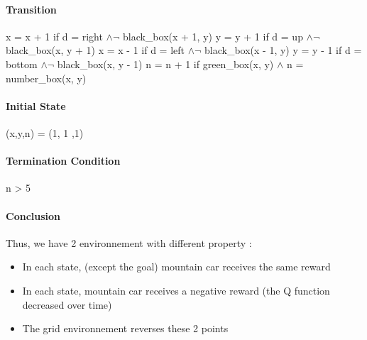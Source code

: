 \documentclass[a4paper,12pt]{article}
\begin{document}
      \paragraph{Transition}  
	x = x + 1 if d = right $\wedge \neg$ black\_box(x + 1, y) \newline
	y = y + 1 if d = up $\wedge \neg$ black\_box(x, y + 1) \newline
	x = x - 1 if d = left $\wedge \neg$ black\_box(x - 1, y) \newline
	y = y - 1 if d = bottom $\wedge \neg$ black\_box(x, y - 1) \newline
	n = n + 1 if green\_box(x, y) $\wedge$ n = number\_box(x, y) 
      
      \paragraph{Initial State}
      (x,y,n) = (1, 1 ,1)
      
      \paragraph{Termination Condition}
      n > 5
      \\[1.5cm]
      \paragraph{Conclusion}
      Thus, we have 2 environnement with different property :
      \begin{itemize}
       \item In each state, (except the goal) mountain car receives the same reward
       \item In each state, mountain car receives a negative reward (the Q function decreased over time)
       \item The grid environnement reverses these 2 points
      \end{itemize}
\end{document}
